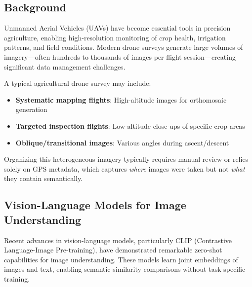 
\subsection{Background}

Unmanned Aerial Vehicles (UAVs) have become essential tools in precision agriculture, enabling high-resolution monitoring of crop health, irrigation patterns, and field conditions. Modern drone surveys generate large volumes of imagery---often hundreds to thousands of images per flight session---creating significant data management challenges.


A typical agricultural drone survey may include:
\begin{itemize}
    \item \textbf{Systematic mapping flights}: High-altitude images for orthomosaic generation
    \item \textbf{Targeted inspection flights}: Low-altitude close-ups of specific crop areas
    \item \textbf{Oblique/transitional images}: Various angles during ascent/descent
\end{itemize}

Organizing this heterogeneous imagery typically requires manual review or relies solely on GPS metadata, which captures \emph{where} images were taken but not \emph{what} they contain semantically.

\subsection{Vision-Language Models for Image Understanding}

Recent advances in vision-language models, particularly CLIP (Contrastive Language-Image Pre-training), have demonstrated remarkable zero-shot capabilities for image understanding. These models learn joint embeddings of images and text, enabling semantic similarity comparisons without task-specific training.


